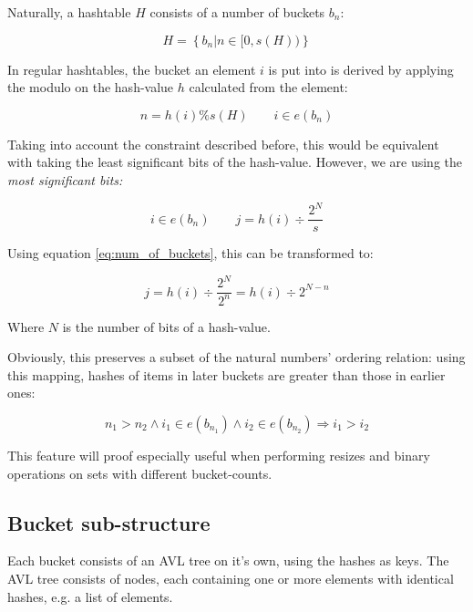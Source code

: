         Naturally, a hashtable $H$ consists of a number of buckets $b_n$:

        \begin{equation}
            H = \left\{ b_n | n \in [0, s(H)) \right\}
        \end{equation}

        In regular hashtables, the bucket an element $i$ is put into is derived
        by applying the modulo on the hash-value $h$ calculated from the
        element:

        \begin{equation}
            n = h(i) \% s(H) \qquad i \in e(b_n)
        \end{equation}

        Taking into account the constraint described before, this would be
        equivalent with taking the least significant bits of the hash-value.
        However, we are using the \em most\em{} significant bits:

        \begin{equation}
            i \in e(b_n) \qquad j = h(i) \div \frac{2^N}{s}
        \end{equation}

        Using equation \ref{eq:num_of_buckets}, this can be transformed to:

        \begin{equation}
            j = h(i) \div \frac{2^N}{2^n} = h(i) \div 2^{N - n}
        \end{equation}

        Where $N$ is the number of bits of a hash-value.
        
        Obviously, this preserves a subset of the natural numbers' ordering
        relation: using this mapping, hashes of items in later buckets are
        greater than those in earlier ones:

        \begin{equation}
            n_1 > n_2 \land i_1 \in e(b_{n_1}) \land i_2 \in e(b_{n_2})
            \Rightarrow i_1 > i_2
        \end{equation}

        This feature will proof especially useful when performing resizes and
        binary operations on sets with different bucket-counts.

    \subsection{Bucket sub-structure}
    \label{sec:data_layout-bucketstruct}

        Each bucket consists of an AVL tree on it's own, using the hashes as
        keys.
        The AVL tree consists of nodes, each containing one or more elements
        with identical hashes, e.g. a list of elements.


